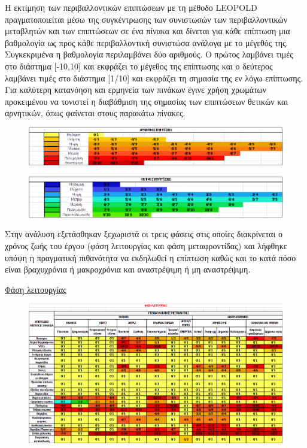 \documentclass[12pt]{article}
\newcommand{\gr}{\selectlanguage{greek}}
\newcommand{\eng}{\selectlanguage{english}}
\begin{document}
	Η εκτίμηση των περιβαλλοντικών επιπτώσεων με τη μέθοδο \eng LEOPOLD \gr πραγματοποιείται μέσω της συγκέντρωσης των συνιστωσών των περιβαλλοντικών μεταβλητών και των επιπτώσεων σε ένα πίνακα και δίνεται για κάθε επίπτωση μια βαθμολογία ως προς κάθε περιβαλλοντική συνιστώσα ανάλογα με το μέγεθός της. Συγκεκριμένα η βαθμολογία περιλαμβάνει δύο αριθμούς. Ο πρώτος λαμβάνει τιμές στο διάστημα [-10,10] και εκφράζει το μέγεθος της επίπτωσης και ο δεύτερος λαμβάνει τιμές στο διάστημα [1/10] και εκφράζει τη σημασία της εν λόγω επίπτωσης. Για καλύτερη κατανόηση και ερμηνεία των πινάκων έγινε χρήση χρωμάτων προκειμένου να τονιστεί η διαβάθμιση της σημασίας των επιπτώσεων θετικών και αρνητικών, όπως φαίνεται στους παρακάτω πίνακες. 
	
	\begin{figure} [H]
		\begin{center}
			\includegraphics [scale = 0.60] {table24.png}
		\end{center}
	\end{figure}

	\begin{figure} [H]
		\begin{center}
			\includegraphics [scale = 0.65] {table25.png}
		\end{center}
	\end{figure}

	Στην ανάλυση εξετάσθηκαν ξεχωριστά οι τρεις φάσεις στις οποίες διακρίνεται ο χρόνος ζωής του έργου (φάση λειτουργίας και φάση μεταφροντίδας) και λήφθηκε υπόψη η πραγματική πιθανότητα να εκδηλωθεί η επίπτωση καθώς και το κατά πόσο είναι βραχυχρόνια ή μακροχρόνια και αναστρέψιμη ή μη αναστρέψιμη.
	
	\underline{Φάση λειτουργίας}
	
	\begin{figure} [H]
		\begin{center}
			\includegraphics [scale = 0.65] {table26.png}
		\end{center}
	\end{figure}
\end{document}
